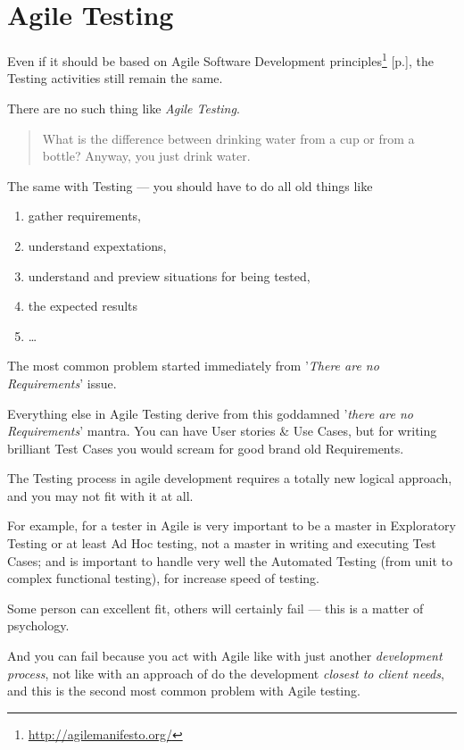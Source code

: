 \section{Agile Testing}
\label{sec:Agile Testing}

Even if it should be based on Agile Software Development principles\footnote{\url{http://agilemanifesto.org/}} [p.\pageref{sec:Agile Software Development}], the Testing activities still remain the same.

There are no such thing like \emph{Agile Testing}.

\begin{quote}
What is the difference between drinking water from a cup or from a bottle? Anyway, you just drink water.
\end{quote}

The same with Testing — you should have to do all old things like 

\begin{enumerate}
 \item 
 gather requirements,
 \item 
 understand expextations,
  \item 
 understand and preview situations for being tested,
  \item 
 the expected results
  \item 
  …
 \end{enumerate}

The most common problem started immediately from '\emph{There are no Requirements}' issue.

Everything else in Agile Testing derive from this goddamned '\emph{there are no Requirements}' mantra. You can have User stories \& Use Cases, but for writing brilliant Test Cases you would scream for good brand old Requirements.

The Testing process in agile development requires a totally new logical approach, and you may not fit with it at all.

For example, for a tester in Agile is very important to be a master in Exploratory Testing or at least Ad Hoc testing, not a master in writing and executing Test Cases; and is important to handle very well the Automated Testing (from unit to complex functional testing), for increase speed of testing.

Some person can excellent fit, others will certainly fail — this is a matter of psychology.

And you can fail because you act with Agile like with just another \emph{development process}, not like with an approach of do the development \emph{closest to client needs}, and this is the second most common problem with Agile testing. 